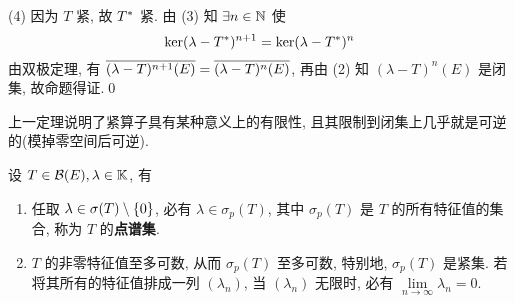 \begin{Proof}
		(4) 因为 $ T $ 紧, 故 $ \Star{T} $ 紧. 由 (3) 知 $ \exists n\in\N $ 使
		\[
			\ker(\lambda-\Star{T})^{n+1}=\ker(\lambda-\Star{T})^{n}
		\]
		由双极定理, 有 $ \baro{(\lambda-T)^{n+1}(E)}=\baro{(\lambda-T)^{n}(E)} $, 再由 (2) 知 $ (\lambda-T)^{n}(E) $ 是闭集, 故命题得证.\qed
	\end{Proof}
	
	\begin{Remark}
		上一定理说明了紧算子具有某种意义上的有限性, 且其限制到闭集上几乎就是可逆的(模掉零空间后可逆).
	\end{Remark}

	\begin{Theorem}\label{thm:紧算子的点谱集性质}
		设 $ T\in\CB(E), \lambda\in\K $, 有
		\begin{enumerate}[(1)]
			\item 任取 $ \lambda\in\sigma(T)\sm \{ 0 \} $, 必有 $ \lambda\in\sigma_{p}(T) $, 其中 $ \sigma_{p}(T) $ 是 $ T $ 的所有特征值的集合, 称为 $ T $ 的\textbf{点谱集}.
			\item $ T $ 的非零特征值至多可数, 从而 $ \sigma_{p}(T) $ 至多可数, 特别地,  $ \sigma_{p}(T) $ 是紧集. 若将其所有的特征值排成一列 $ (\lambda_{n}) $, 当 $ (\lambda_{n}) $ 无限时, 必有 $ \lim\limits_{n\to\infty}\lambda_{n}=0 $.
		\end{enumerate}
	\end{Theorem}
